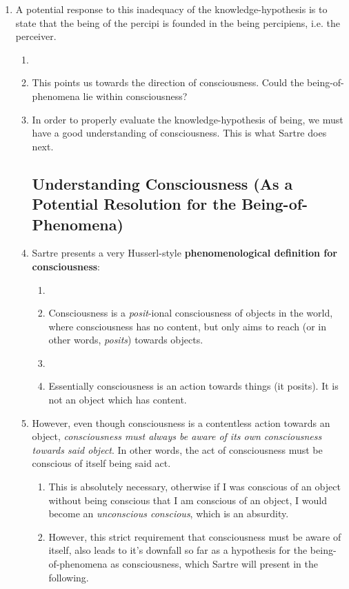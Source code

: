 \begin{enumerate}
  \item A potential response to this inadequacy of the knowledge-hypothesis is to state that the being of the percipi is founded in the being percipiens, i.e. the perceiver.
  \begin{enumerate}
    \item {}
    \item This points us towards the direction of consciousness. Could the being-of-phenomena lie within consciousness?
    \item In order to properly evaluate the knowledge-hypothesis of being, we must have a good understanding of consciousness. This is what Sartre does next.

    \subsection{Understanding Consciousness (As a Potential Resolution for the Being-of-Phenomena)}
    \item Sartre presents a very Husserl-style \textbf{phenomenological definition for consciousness}:
    \begin{enumerate}
      \item {}
      \item Consciousness is a \emph{posit}-ional consciousness of objects in the world, where consciousness has no content, but only aims to reach (or in other words, \emph{posits}) towards objects.
      \item {}
      \item Essentially consciousness is an action towards things (it posits). It is not an object which has content.
    \end{enumerate}
    \item However, even though consciousness is a contentless action towards an object, \emph{consciousness must always be aware of its own consciousness towards said object}. In other words, the act of consciousness must be conscious of itself being said act.
    \begin{enumerate}
      \item This is absolutely necessary, otherwise if I was conscious of an object without being conscious that I am conscious of an object, I would become an \emph{unconscious conscious}, which is an absurdity.
      \item However, this strict requirement that consciousness must be aware of itself, also leads to it's downfall so far as a hypothesis for the being-of-phenomena as consciousness, which Sartre will present in the following.
    \end{enumerate}
  \end{enumerate}


\end{enumerate}
